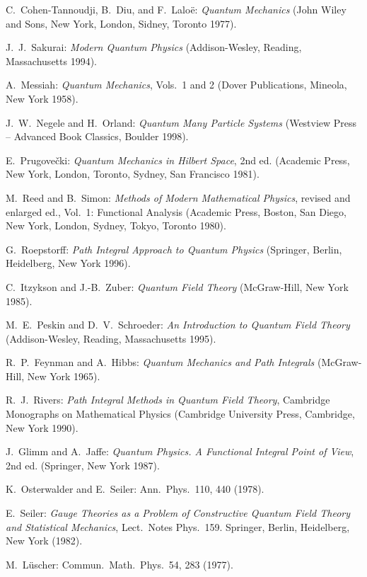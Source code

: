 \begin{enumerate}[label={[\arabic*]}]
  \item C.~Cohen-Tannoudji, B.~Diu, and F.~Lalo\"e: \emph{Quantum Mechanics}
        (John Wiley and Sons, New York, London, Sidney, Toronto 1977).
  \item J.~J.~Sakurai: \emph{Modern Quantum Physics} (Addison-Wesley, Reading,
        Massachusetts 1994).
  \item A.~Messiah: \emph{Quantum Mechanics}, Vols.~1 and 2 (Dover
        Publications, Mineola, New York 1958).
  \item J.~W.~Negele and H.~Orland: \emph{Quantum Many Particle Systems}
        (Westview Press -- Advanced Book Classics, Boulder 1998).
  \item E.~Prugove\v{c}ki: \emph{Quantum Mechanics in Hilbert Space}, 2nd ed.
        (Academic Press, New York, London, Toronto, Sydney, San Francisco
        1981).
  \item M.~Reed and B.~Simon: \emph{Methods of Modern Mathematical Physics},
        revised and enlarged ed., Vol.~1: Functional Analysis (Academic Press,
        Boston, San Diego, New York, London, Sydney, Tokyo, Toronto 1980).
  \item G.~Roepstorff: \emph{Path Integral Approach to Quantum Physics}
        (Springer, Berlin, Heidelberg, New York 1996).
  \item C.~Itzykson and J.-B.~Zuber: \emph{Quantum Field Theory} (McGraw-Hill,
        New York 1985).
  \item M.~E.~Peskin and D.~V.~Schroeder: \emph{An Introduction to Quantum
        Field Theory} (Addison-Wesley, Reading, Massachusetts 1995).
  \item R.~P.~Feynman and A.~Hibbs: \emph{Quantum Mechanics and Path
        Integrals} (McGraw-Hill, New York 1965).
  \item R.~J.~Rivers: \emph{Path Integral Methods in Quantum Field Theory},
        Cambridge Monographs on Mathematical Physics (Cambridge University
        Press, Cambridge, New York 1990).
  \item J.~Glimm and A.~Jaffe: \emph{Quantum Physics. A Functional Integral
        Point of View}, 2nd ed. (Springer, New York 1987).
  \item K.~Osterwalder and E.~Seiler: Ann.\ Phys.\ 110, 440 (1978).
  \item E.~Seiler: \emph{Gauge Theories as a Problem of Constructive Quantum
        Field Theory and Statistical Mechanics}, Lect.\ Notes Phys.\ 159.
        Springer, Berlin, Heidelberg, New York (1982).
  \item M.~L\"uscher: Commun.\ Math.\ Phys.\ 54, 283 (1977).
\end{enumerate}
